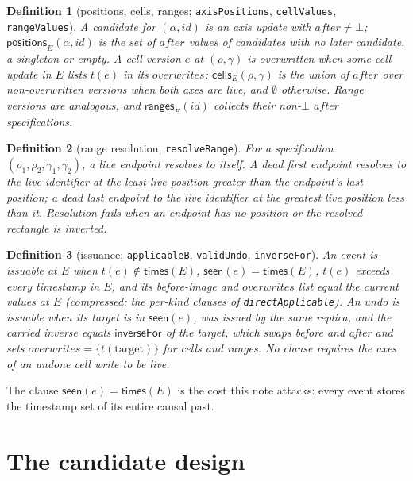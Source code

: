 \documentclass[11pt]{article}
\newtheorem{definition}{Definition}[section]
\newcommand{\lean}[1]{\texttt{\def\_{\textunderscore\allowbreak}#1}}
\newcommand{\seen}{\mathsf{seen}}
\newcommand{\cells}{\mathsf{cells}}
\newcommand{\ranges}{\mathsf{ranges}}
\begin{document}
\begin{definition}[positions, cells, ranges; \lean{axisPositions}, \lean{cellValues}, \lean{rangeValues}]
A candidate for $(\alpha,\mathit{id})$ is an axis update with
$\mathit{after}\neq\bot$; $\mathsf{positions}_E(\alpha,\mathit{id})$ is the
set of $\mathit{after}$ values of candidates with no later candidate, a
singleton or empty. A cell version $e$ at $(\rho,\gamma)$ is overwritten when
some cell update in $E$ lists $t(e)$ in its $\mathit{overwrites}$;
$\cells_E(\rho,\gamma)$ is the union of $\mathit{after}$ over non-overwritten
versions when both axes are live, and $\emptyset$ otherwise. Range versions
are analogous, and $\ranges_E(\mathit{id})$ collects their non-$\bot$
$\mathit{after}$ specifications.
\end{definition}

\begin{definition}[range resolution; \lean{resolveRange}]
For a specification $(\rho_1,\rho_2,\gamma_1,\gamma_2)$, a live endpoint
resolves to itself. A dead first endpoint resolves to the live identifier at
the least live position greater than the endpoint's last position; a dead
last endpoint to the live identifier at the greatest live position less than
it. Resolution fails when an endpoint has no position or the resolved
rectangle is inverted.
\end{definition}

\begin{definition}[issuance; \lean{applicableB}, \lean{validUndo}, \lean{inverseFor}]
An event is issuable at $E$ when $t(e)\notin\mathsf{times}(E)$,
$\seen(e)=\mathsf{times}(E)$, $t(e)$ exceeds every timestamp in $E$, and its
before-image and $\mathit{overwrites}$ list equal the current values at $E$
(compressed: the per-kind clauses of \lean{directApplicable}). An undo is
issuable when its target is in $\seen(e)$, was issued by the same replica,
and the carried inverse equals $\mathsf{inverseFor}$ of the target, which
swaps before and after and sets $\mathit{overwrites}=\{t(\text{target})\}$
for cells and ranges. No clause requires the axes of an undone cell write
to be live.
\end{definition}

The clause $\seen(e)=\mathsf{times}(E)$ is the cost this note attacks: every
event stores the timestamp set of its entire causal past.

\section{The candidate design}
\label{sec:design}
\end{document}
